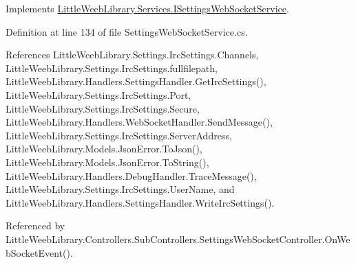 Implements \mbox{\hyperlink{interface_little_weeb_library_1_1_services_1_1_i_settings_web_socket_service_a553587be5ed3abeda3a1c239a93b65c2}{Little\+Weeb\+Library.\+Services.\+I\+Settings\+Web\+Socket\+Service}}.



Definition at line 134 of file Settings\+Web\+Socket\+Service.\+cs.



References Little\+Weeb\+Library.\+Settings.\+Irc\+Settings.\+Channels, Little\+Weeb\+Library.\+Settings.\+Irc\+Settings.\+fullfilepath, Little\+Weeb\+Library.\+Handlers.\+Settings\+Handler.\+Get\+Irc\+Settings(), Little\+Weeb\+Library.\+Settings.\+Irc\+Settings.\+Port, Little\+Weeb\+Library.\+Settings.\+Irc\+Settings.\+Secure, Little\+Weeb\+Library.\+Handlers.\+Web\+Socket\+Handler.\+Send\+Message(), Little\+Weeb\+Library.\+Settings.\+Irc\+Settings.\+Server\+Address, Little\+Weeb\+Library.\+Models.\+Json\+Error.\+To\+Json(), Little\+Weeb\+Library.\+Models.\+Json\+Error.\+To\+String(), Little\+Weeb\+Library.\+Handlers.\+Debug\+Handler.\+Trace\+Message(), Little\+Weeb\+Library.\+Settings.\+Irc\+Settings.\+User\+Name, and Little\+Weeb\+Library.\+Handlers.\+Settings\+Handler.\+Write\+Irc\+Settings().



Referenced by Little\+Weeb\+Library.\+Controllers.\+Sub\+Controllers.\+Settings\+Web\+Socket\+Controller.\+On\+Web\+Socket\+Event().


